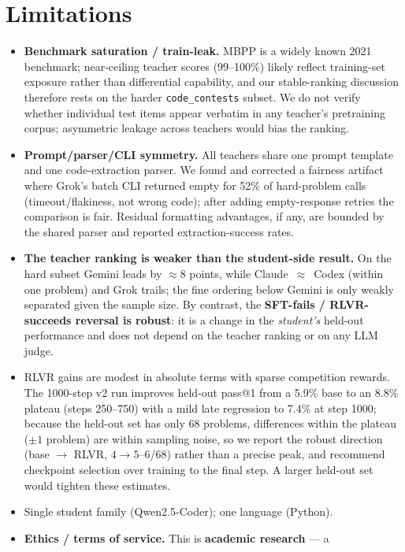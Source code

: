 \documentclass[11pt]{article}
\begin{document}
\section{Limitations}
\label{sec:limits}
\begin{itemize}
  \item \textbf{Benchmark saturation / train-leak.} MBPP is a widely known 2021 benchmark;
    near-ceiling teacher scores (99--100\%) likely reflect training-set exposure rather than
    differential capability, and our stable-ranking discussion therefore rests on the harder
    \texttt{code\_contests} subset. We do not verify whether individual test items appear
    verbatim in any teacher's pretraining corpus; asymmetric leakage across teachers would bias
    the ranking.
  \item \textbf{Prompt/parser/CLI symmetry.} All teachers share one prompt template and one
    code-extraction parser. We found and corrected a fairness artifact where Grok's batch CLI
    returned empty for 52\% of hard-problem calls (timeout/flakiness, not wrong code); after
    adding empty-response retries the comparison is fair. Residual formatting advantages, if any,
    are bounded by the shared parser and reported extraction-success rates.
  \item \textbf{The teacher ranking is weaker than the student-side result.} On the hard subset
    Gemini leads by $\approx$8 points, while Claude~$\approx$~Codex (within one problem) and Grok
    trails; the fine ordering below Gemini is only weakly separated given the sample size. By
    contrast, the \textbf{SFT-fails / RLVR-succeeds reversal is robust}: it is a change in the
    \emph{student's} held-out performance and does not depend on the teacher ranking or on any LLM judge.
  \item RLVR gains are modest in absolute terms with sparse competition rewards. The 1000-step
    v2 run improves held-out pass@1 from a 5.9\% base to an 8.8\% plateau (steps 250--750) with a
    mild late regression to 7.4\% at step 1000; because the held-out set has only 68 problems,
    differences within the plateau ($\pm1$ problem) are within sampling noise, so we report the
    robust direction (base $\to$ RLVR, $4\to5$--$6$/68) rather than a precise peak, and recommend
    checkpoint selection over training to the final step. A larger held-out set would tighten these
    estimates.
  \item Single student family (Qwen2.5-Coder); one language (Python).
  \item \textbf{Ethics / terms of service.} This is \textbf{academic research} --- a

\end{itemize}
\end{document}

